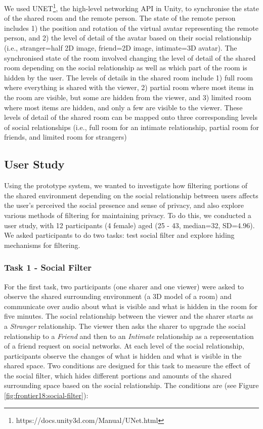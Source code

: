 We used UNET\footnote{https://docs.unity3d.com/Manual/UNet.html}, the high-level networking API in Unity, to synchronise the state of the shared room and the remote person. The state of the remote person includes 1) the position and rotation of the virtual avatar representing the remote person, and 2) the level of detail of the avatar based on their social relationship (i.e., stranger=half 2D image, friend=2D image, intimate=3D avatar). The synchronised state of the room involved changing the level of detail of the shared room depending on the social relationship as well as which part of the room is hidden by the user. The levels of details in the shared room include 1) full room where everything is shared with the viewer, 2) partial room where most items in the room are visible, but some are hidden from the viewer, and 3) limited room where most items are hidden, and only a few are visible to the viewer. These levels of detail of the shared room can be mapped onto three corresponding levels of social relationships (i.e., full room for an intimate relationship, partial room for friends, and limited room for strangers)

\subsection{User Study}

Using the prototype system, we wanted to investigate how filtering portions of the shared environment depending on the social relationship between users affects the user's perceived the social presence and sense of privacy, and also explore various methods of filtering for maintaining privacy. To do this, we conducted a user study, with 12 participants (4 female) aged (25 - 43, median=32, SD=4.96). 
We asked participants to do two tasks: test social filter and explore hiding mechanisms for filtering.

\subsubsection{Task 1 - Social Filter}

For the first task, two participants (one sharer and one viewer) were asked to observe the shared surrounding environment (a 3D model of a room) and communicate over audio about what is visible and what is hidden in the room for five minutes. The social relationship between the viewer and the sharer starts as a \textit{Stranger} relationship. The viewer then asks the sharer to upgrade the social relationship to a \textit{Friend} and then to an \textit{Intimate} relationship as a representation of a friend request on social networks. At each level of the social relationship, participants observe the changes of what is hidden and what is visible in the shared space. Two conditions are designed for this task to measure the effect of the social filter, which hides different portions and amounts of the shared surrounding space based on the social relationship. The conditions are (see Figure \ref{fig:frontier18:social-filter}): 

